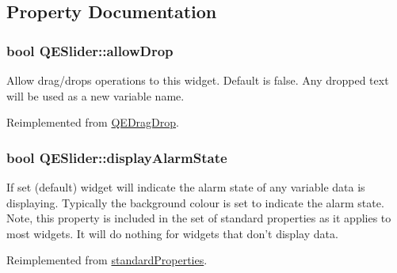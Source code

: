 \subsection{Property Documentation}
\hypertarget{classQESlider_a73f36512a78d3dac3d3087c4c8d2f701}{
\subsubsection[{allowDrop}]{\setlength{\rightskip}{0pt plus 5cm}bool QESlider::allowDrop}}
\label{classQESlider_a73f36512a78d3dac3d3087c4c8d2f701}
Allow drag/drops operations to this widget. Default is false. Any dropped text will be used as a new variable name. 

Reimplemented from \hyperlink{classQEDragDrop}{QEDragDrop}.

\hypertarget{classQESlider_a7b8aa02993b037b8b8dd94b811091178}{
\subsubsection[{displayAlarmState}]{\setlength{\rightskip}{0pt plus 5cm}bool QESlider::displayAlarmState}}
\label{classQESlider_a7b8aa02993b037b8b8dd94b811091178}
If set (default) widget will indicate the alarm state of any variable data is displaying. Typically the background colour is set to indicate the alarm state. Note, this property is included in the set of standard properties as it applies to most widgets. It will do nothing for widgets that don't display data. 

Reimplemented from \hyperlink{classstandardProperties}{standardProperties}.

